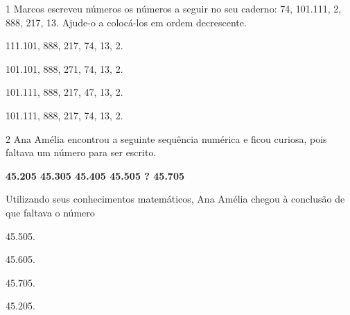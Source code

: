 \num{1} Marcos escreveu números os números a seguir no seu caderno: 74, 101.111, 2, 888, 217, 13. Ajude-o a colocá-los em ordem decrescente.  

\begin{escolha}
\item 111.101, 888, 217, 74, 13, 2.

\item 101.101, 888, 271, 74, 13, 2.

\item 101.111, 888, 217, 47, 13, 2.

\item 101.111, 888, 217, 74, 13, 2.
\end{escolha}

\num{2} Ana Amélia encontrou a seguinte sequência numérica e ficou curiosa, pois
faltava um número para ser escrito.

\begin{mdframed}[linewidth=2pt,linecolor=azul!20,backgroundcolor=azul!20,roundcorner=2pt]
\textbf{45.205 \hfill 45.305 \hfill 45.405 \hfill 45.505 \hfill ? \hfill 45.705 \hfill}
\end{mdframed}

Utilizando seus conhecimentos matemáticos, Ana Amélia chegou à conclusão de que
faltava o número

\begin{escolha}
\item
  45.505.
\item
  45.605.
\item
  45.705.
\item
  45.205.
\end{escolha}

